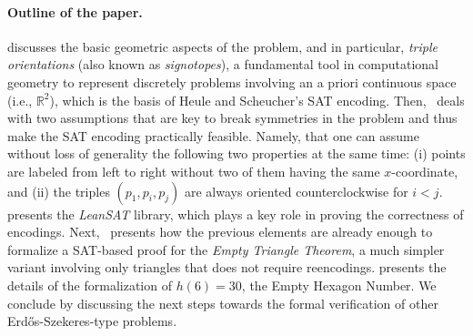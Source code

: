 \paragraph{Outline of the paper.}  discusses the basic geometric aspects of the problem, and in particular, \emph{triple orientations} (also known as \emph{signotopes}), a fundamental tool in computational geometry to represent discretely problems involving an a priori continuous space (i.e., $\mathbb{R}^2$), which is the basis of Heule and Scheucher's SAT encoding. Then,~ deals with two assumptions that are key to break symmetries in the problem and thus make the SAT encoding practically feasible. Namely, that one can assume without loss of generality the following two properties at the same time: (i) points are labeled from left to right without two of them having the same $x$-coordinate, and (ii) the triples $(p_1, p_i, p_j)$ are always oriented counterclockwise for $i < j$. 
 presents the \emph{LeanSAT} library, which plays a key role in proving the correctness of encodings. Next,~ presents how the previous elements are already enough to formalize a SAT-based proof for the \emph{Empty Triangle Theorem}, a much simpler variant involving only triangles that does not require reencodings.  presents the details of the formalization of $h(6) = 30$, the Empty Hexagon Number. We conclude by discussing the next steps towards the formal verification of other Erd\H{o}s-Szekeres-type problems.
